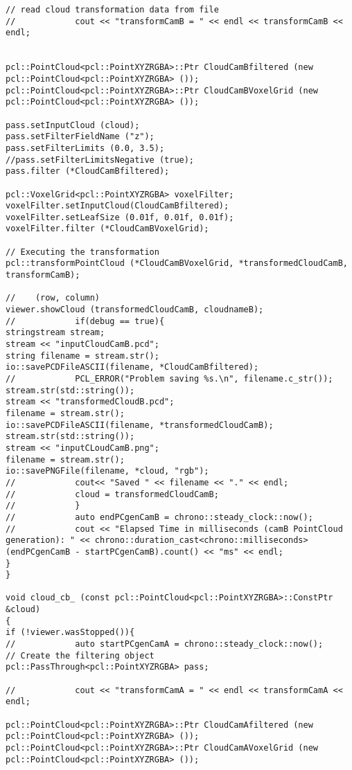 \begin{lstlisting}[frame = single, label={lst:cppread1}]
// read cloud transformation data from file
//            cout << "transformCamB = " << endl << transformCamB << endl;


pcl::PointCloud<pcl::PointXYZRGBA>::Ptr CloudCamBfiltered (new pcl::PointCloud<pcl::PointXYZRGBA> ());
pcl::PointCloud<pcl::PointXYZRGBA>::Ptr CloudCamBVoxelGrid (new pcl::PointCloud<pcl::PointXYZRGBA> ());

pass.setInputCloud (cloud);
pass.setFilterFieldName ("z");
pass.setFilterLimits (0.0, 3.5);
//pass.setFilterLimitsNegative (true);
pass.filter (*CloudCamBfiltered);

pcl::VoxelGrid<pcl::PointXYZRGBA> voxelFilter;
voxelFilter.setInputCloud(CloudCamBfiltered);
voxelFilter.setLeafSize (0.01f, 0.01f, 0.01f);
voxelFilter.filter (*CloudCamBVoxelGrid);

// Executing the transformation
pcl::transformPointCloud (*CloudCamBVoxelGrid, *transformedCloudCamB, transformCamB);

//    (row, column)
viewer.showCloud (transformedCloudCamB, cloudnameB);
//            if(debug == true){
stringstream stream;
stream << "inputCloudCamB.pcd";
string filename = stream.str();
io::savePCDFileASCII(filename, *CloudCamBfiltered);
//            PCL_ERROR("Problem saving %s.\n", filename.c_str());
stream.str(std::string());
stream << "transformedCloudB.pcd";
filename = stream.str();
io::savePCDFileASCII(filename, *transformedCloudCamB);
stream.str(std::string());
stream << "inputCLoudCamB.png";
filename = stream.str();
io::savePNGFile(filename, *cloud, "rgb");
//            cout<< "Saved " << filename << "." << endl;
//            cloud = transformedCloudCamB;
//            }
//            auto endPCgenCamB = chrono::steady_clock::now();
//            cout << "Elapsed Time in milliseconds (camB PointCloud generation): " << chrono::duration_cast<chrono::milliseconds>(endPCgenCamB - startPCgenCamB).count() << "ms" << endl;
}
}

void cloud_cb_ (const pcl::PointCloud<pcl::PointXYZRGBA>::ConstPtr &cloud)
{
if (!viewer.wasStopped()){
//            auto startPCgenCamA = chrono::steady_clock::now();
// Create the filtering object
pcl::PassThrough<pcl::PointXYZRGBA> pass;

//            cout << "transformCamA = " << endl << transformCamA << endl;

pcl::PointCloud<pcl::PointXYZRGBA>::Ptr CloudCamAfiltered (new pcl::PointCloud<pcl::PointXYZRGBA> ());
pcl::PointCloud<pcl::PointXYZRGBA>::Ptr CloudCamAVoxelGrid (new pcl::PointCloud<pcl::PointXYZRGBA> ());


\end{lstlisting}
